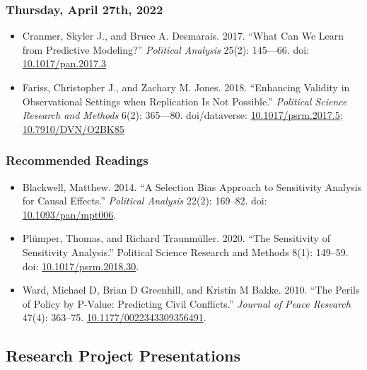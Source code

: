\documentclass[12pt,]{article}
\begin{document}
\hypertarget{thursday-april-27th-2022}{%
\subsubsection{Thursday, April 27th,
2022}\label{thursday-april-27th-2022}}

\begin{itemize}
\item
  Cranmer, Skyler J., and Bruce A. Desmarais. 2017. ``What Can We Learn
  from Predictive Modeling?'' \emph{Political Analysis} 25(2): 145---66.
  doi: \href{https://doi.org/10.1017/pan.2017.3}{10.1017/pan.2017.3}
\item
  Fariss, Christopher J., and Zachary M. Jones. 2018. ``Enhancing
  Validity in Observational Settings when Replication Is Not Possible.''
  \emph{Political Science Research and Methods} 6(2): 365---80.
  doi/dataverse:
  \href{https://doi.org/10.1017/psrm.2017.5}{10.1017/psrm.2017.5};
  \href{http://dx.doi.org/10.7910/DVN/O2BK85}{10.7910/DVN/O2BK85}
\end{itemize}

\hypertarget{recommended-readings-11}{%
\subsubsection{Recommended Readings}\label{recommended-readings-11}}

\begin{itemize}
\item
  Blackwell, Matthew. 2014. ``A Selection Bias Approach to Sensitivity
  Analysis for Causal Effects.'' \emph{Political Analysis} 22(2):
  169--82. doi:
  \href{https://doi.org/10.1093/pan/mpt006}{10.1093/pan/mpt006}.
\item
  Plümper, Thomas, and Richard Traunmüller. 2020. ``The Sensitivity of
  Sensitivity Analysis.'' Political Science Research and Methods 8(1):
  149--59. doi:
  \href{https://doi.org/10.1017/psrm.2018.30}{10.1017/psrm.2018.30}.
\item
  Ward, Michael D, Brian D Greenhill, and Kristin M Bakke. 2010. ``The
  Perils of Policy by P-Value: Predicting Civil Conflicts.''
  \emph{Journal of Peace Research} 47(4): 363--75.
  \href{https://doi.org/10.1177/0022343309356491}{10.1177/0022343309356491}.
\end{itemize}

\hypertarget{research-project-presentations}{%
\subsection{Research Project
Presentations}\label{research-project-presentations}}
\end{document}
